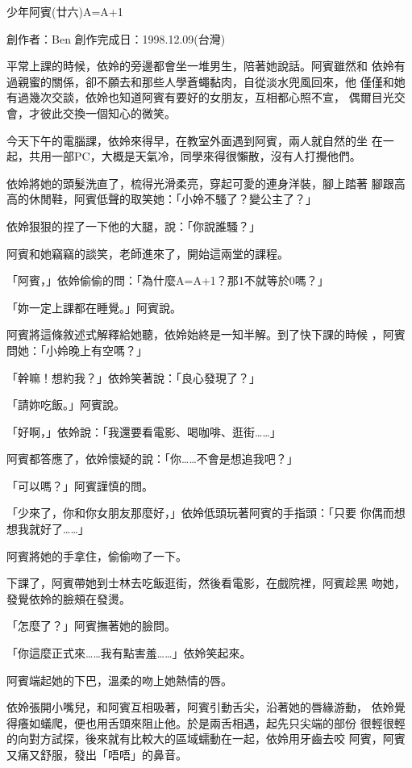 



少年阿賓(廿六)A=A+1

創作者：Ben
創作完成日：1998.12.09(台灣)


平常上課的時候，依姈的旁邊都會坐一堆男生，陪著她說話。阿賓雖然和
依姈有過親蜜的關係，卻不願去和那些人學蒼蠅黏肉，自從淡水兜風回來，他
僅僅和她有過幾次交談，依姈也知道阿賓有要好的女朋友，互相都心照不宣，
偶爾目光交會，才彼此交換一個知心的微笑。

今天下午的電腦課，依姈來得早，在教室外面遇到阿賓，兩人就自然的坐
在一起，共用一部PC，大概是天氣冷，同學來得很懶散，沒有人打攪他們。

依姈將她的頭髮洗直了，梳得光滑柔亮，穿起可愛的連身洋裝，腳上踏著
腳跟高高的休閒鞋，阿賓低聲的取笑她：「小姈不騷了？變公主了？」

依姈狠狠的捏了一下他的大腿，說：「你說誰騷？」

阿賓和她竊竊的談笑，老師進來了，開始這兩堂的課程。

「阿賓，」依姈偷偷的問：「為什麼A=A+1？那1不就等於0嗎？」

「妳一定上課都在睡覺。」阿賓說。

阿賓將這條敘述式解釋給她聽，依姈始終是一知半解。到了快下課的時候
，阿賓問她：「小姈晚上有空嗎？」

「幹嘛！想約我？」依姈笑著說：「良心發現了？」

「請妳吃飯。」阿賓說。

「好啊，」依姈說：「我還要看電影、喝咖啡、逛街……」

阿賓都答應了，依姈懷疑的說：「你……不會是想追我吧？」

「可以嗎？」阿賓謹慎的問。

「少來了，你和你女朋友那麼好，」依姈低頭玩著阿賓的手指頭：「只要
你偶而想想我就好了……」

阿賓將她的手拿住，偷偷吻了一下。

下課了，阿賓帶她到士林去吃飯逛街，然後看電影，在戲院裡，阿賓趁黑
吻她，發覺依姈的臉頰在發燙。

「怎麼了？」阿賓撫著她的臉問。

「你這麼正式來……我有點害羞……」依姈笑起來。

阿賓端起她的下巴，溫柔的吻上她熱情的唇。

依姈張開小嘴兒，和阿賓互相吸著，阿賓引動舌尖，沿著她的唇緣游動，
依姈覺得癢如蟻爬，便也用舌頭來阻止他。於是兩舌相遇，起先只尖端的部份
很輕很輕的向對方試探，後來就有比較大的區域蠕動在一起，依姈用牙齒去咬
阿賓，阿賓又痛又舒服，發出「唔唔」的鼻音。

